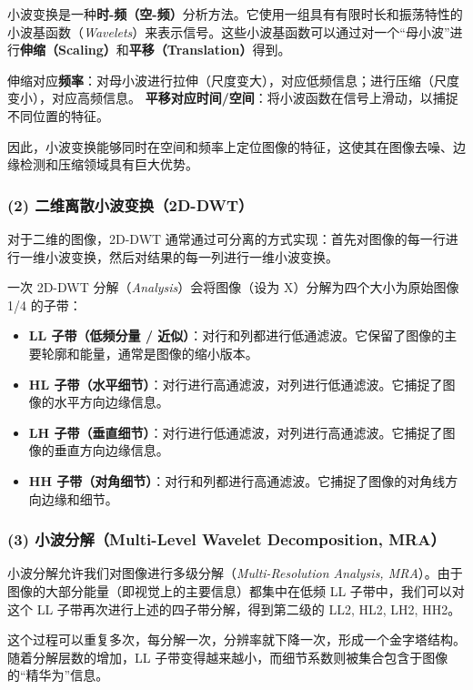 \documentclass[12pt, a4paper]{article}
\begin{document}
小波变换是一种\textbf{时-频（空-频）}分析方法。它使用一组具有有限时长和振荡特性的小波基函数（\textit{Wavelets}）来表示信号。这些小波基函数可以通过对一个“母小波”进行\textbf{伸缩（Scaling）}和\textbf{平移（Translation）}得到。

伸缩对应\textbf{频率}：对母小波进行拉伸（尺度变大），对应低频信息；进行压缩（尺度变小），对应高频信息。
\textbf{平移对应时间/空间}：将小波函数在信号上滑动，以捕捉不同位置的特征。

因此，小波变换能够同时在空间和频率上定位图像的特征，这使其在图像去噪、边缘检测和压缩领域具有巨大优势。

\subsubsection*{(2) 二维离散小波变换（2D-DWT）}
对于二维的图像，2D-DWT 通常通过可分离的方式实现：首先对图像的每一行进行一维小波变换，然后对结果的每一列进行一维小波变换。

一次 2D-DWT 分解（\textit{Analysis}）会将图像（设为 X）分解为四个大小为原始图像 1/4 的子带：
\begin{itemize}
    \item \textbf{LL 子带（低频分量 / 近似）}：对行和列都进行低通滤波。它保留了图像的主要轮廓和能量，通常是图像的缩小版本。
    \item \textbf{HL 子带（水平细节）}：对行进行高通滤波，对列进行低通滤波。它捕捉了图像的水平方向边缘信息。
    \item \textbf{LH 子带（垂直细节）}：对行进行低通滤波，对列进行高通滤波。它捕捉了图像的垂直方向边缘信息。
    \item \textbf{HH 子带（对角细节）}：对行和列都进行高通滤波。它捕捉了图像的对角线方向边缘和细节。
\end{itemize}

\subsubsection*{(3) 小波分解（Multi-Level Wavelet Decomposition, MRA）}
小波分解允许我们对图像进行多级分解（\textit{Multi-Resolution Analysis, MRA}）。由于图像的大部分能量（即视觉上的主要信息）都集中在低频 LL 子带中，我们可以对这个 LL 子带再次进行上述的四子带分解，得到第二级的 LL2, HL2, LH2, HH2。

这个过程可以重复多次，每分解一次，分辨率就下降一次，形成一个金字塔结构。随着分解层数的增加，LL 子带变得越来越小，而细节系数则被集合包含于图像的“精华为”信息。
\end{document}

